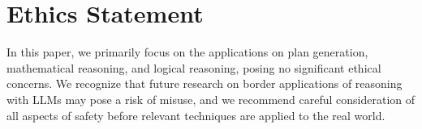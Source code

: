 \documentclass[11pt]{article}
\begin{document}
\section*{Ethics Statement}
In this paper, we primarily focus on the applications on
plan generation, mathematical reasoning, and logical reasoning, posing no significant ethical concerns. We recognize that future research on border applications of reasoning with LLMs may pose a risk of misuse, and we recommend careful consideration of all aspects of safety before relevant techniques are applied to the real world.





\appendix

\end{document}
